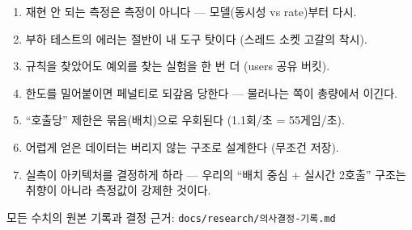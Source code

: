 \documentclass[11pt]{article}
\begin{document}
\begin{enumerate}
  \item 재현 안 되는 측정은 측정이 아니다 --- 모델(동시성 vs rate)부터 다시.
  \item 부하 테스트의 에러는 절반이 내 도구 탓이다 (스레드 소켓 고갈의 착시).
  \item 규칙을 찾았어도 예외를 찾는 실험을 한 번 더 (users 공유 버킷).
  \item 한도를 밀어붙이면 페널티로 되갚음 당한다 --- 물러나는 쪽이 총량에서 이긴다.
  \item ``호출당'' 제한은 묶음(배치)으로 우회된다 (1.1회/초 = 55게임/초).
  \item 어렵게 얻은 데이터는 버리지 않는 구조로 설계한다 (무조건 저장).
  \item 실측이 아키텍처를 결정하게 하라 --- 우리의 ``배치 중심 + 실시간 2호출'' 구조는
        취향이 아니라 측정값이 강제한 것이다.
\end{enumerate}

\bigskip
\noindent 모든 수치의 원본 기록과 결정 근거: \texttt{docs/research/의사결정-기록.md}
\end{document}
